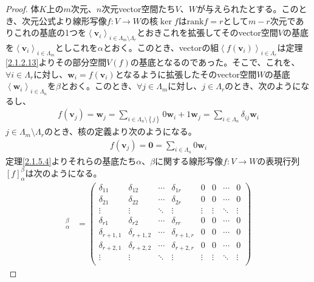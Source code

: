 \documentclass[dvipdfmx]{jsarticle}
\begin{document}
\begin{proof}
体$K$上の$m$次元、$n$次元vector空間たち$V$、$W$が与えられたとする。このとき、次元公式より線形写像$f:V \rightarrow W$の核$\ker f$は${\mathrm{rank}}f = r$として$m - r$次元でありこれの基底の1つを$\left\langle \mathbf{v}_{i} \right\rangle_{i \in \varLambda_{m} \setminus \varLambda_{r}}$とおきこれを拡張してそのvector空間$V$の基底を$\left\langle \mathbf{v}_{i} \right\rangle_{i \in \varLambda_{m}}$としこれを$\alpha$とおく。このとき、vectorの組$\left\langle f\left( \mathbf{v}_{i} \right) \right\rangle_{i \in \varLambda_{r}}$は定理\ref{2.1.2.13}よりその部分空間$V(f)$の基底となるのであった。そこで、これを、$\forall i \in \varLambda_{r}$に対し、$\mathbf{w}_{i} = f\left( \mathbf{v}_{i} \right)$となるように拡張したそのvector空間$W$の基底$\left\langle \mathbf{w}_{i} \right\rangle_{i \in \varLambda_{n}}$を$\beta$とおく。このとき、$\forall j \in \varLambda_{m}$に対し、$j \in \varLambda_{r}$のとき、次のようになるし、
\begin{align*}
f\left( \mathbf{v}_{j} \right) = \mathbf{w}_{j} = \sum_{i \in \varLambda_{n} \setminus \left\{ j \right\}} {0\mathbf{w}_{i}} + 1\mathbf{w}_{j} = \sum_{i \in \varLambda_{n}} {\delta_{ij}\mathbf{w}_{i}}
\end{align*}
$j \in \varLambda_{m} \setminus \varLambda_{r}$のとき、核の定義より次のようになる。
\begin{align*}
f\left( \mathbf{v}_{j} \right) = \mathbf{0} = \sum_{i \in \varLambda_{n}} {0\mathbf{w}_{i}}
\end{align*}
定理\ref{2.1.5.4}よりそれらの基底たち$\alpha 、\beta$に関する線形写像$f:V \rightarrow W$の表現行列$[ f]^{\beta}_{\alpha}$は次のようになる。
\begin{align*}
[ f]^{\beta}_{\alpha} &= \begin{pmatrix}
\delta_{11} & \delta_{12} & \cdots & \delta_{1r} & 0 & 0 & \cdots & 0 \\
\delta_{21} & \delta_{22} & \cdots & \delta_{2r} & 0 & 0 & \cdots & 0 \\
 \vdots & \vdots & \ddots & \vdots & \vdots & \vdots & \ddots & \vdots \\
\delta_{r1} & \delta_{r2} & \cdots & \delta_{rr} & 0 & 0 & \cdots & 0 \\
\delta_{r + 1,1} & \delta_{r + 1,2} & \cdots & \delta_{r + 1,r} & 0 & 0 & \cdots & 0 \\
\delta_{r + 2,1} & \delta_{r + 2,2} & \cdots & \delta_{r + 2,r} & 0 & 0 & \cdots & 0 \\
 \vdots & \vdots & \ddots & \vdots & \vdots & \vdots & \ddots & \vdots \\

\end{pmatrix}
\end{align*}
\end{proof}
\end{document}
